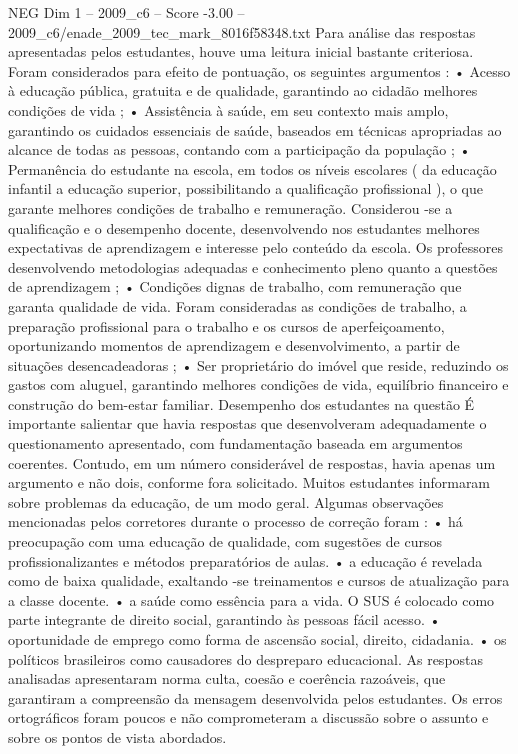 \begin{textsample}{NEG Dim 1 – 2009\_c6 – Score -3.00 – 2009\_c6/enade\_2009\_tec\_mark\_8016f58348.txt}
Para análise das respostas apresentadas pelos estudantes, houve uma leitura inicial bastante criteriosa.
Foram considerados para efeito de pontuação, os seguintes argumentos : • Acesso à educação pública, gratuita e de qualidade, garantindo ao cidadão melhores condições de vida ; • Assistência à saúde, em seu contexto mais amplo, garantindo os cuidados essenciais de saúde, baseados em técnicas apropriadas ao alcance de todas as pessoas, contando com a participação da população ; • Permanência do estudante na escola, em todos os níveis escolares ( da educação infantil a educação superior, possibilitando a qualificação profissional ), o que garante melhores condições de trabalho e remuneração.
Considerou -se a qualificação e o desempenho docente, desenvolvendo nos estudantes melhores expectativas de aprendizagem e interesse pelo conteúdo da escola.
Os professores desenvolvendo metodologias adequadas e conhecimento pleno quanto a questões de aprendizagem ; • Condições dignas de trabalho, com remuneração que garanta qualidade de vida.
Foram consideradas as condições de trabalho, a preparação profissional para o trabalho e os cursos de aperfeiçoamento, oportunizando momentos de aprendizagem e desenvolvimento, a partir de situações desencadeadoras ; • Ser proprietário do imóvel que reside, reduzindo os gastos com aluguel, garantindo melhores condições de vida, equilíbrio financeiro e construção do bem-estar familiar.
Desempenho dos estudantes na questão É importante salientar que havia respostas que desenvolveram adequadamente o questionamento apresentado, com fundamentação baseada em argumentos coerentes.
Contudo, em um número considerável de respostas, havia apenas um argumento e não dois, conforme fora solicitado.
Muitos estudantes informaram sobre problemas da educação, de um modo geral.
Algumas observações mencionadas pelos corretores durante o processo de correção foram : • há preocupação com uma educação de qualidade, com sugestões de cursos profissionalizantes e métodos preparatórios de aulas. • a educação é revelada como de baixa qualidade, exaltando -se treinamentos e cursos de atualização para a classe docente. • a saúde como essência para a vida.
O SUS é colocado como parte integrante de direito social, garantindo às pessoas fácil acesso. • oportunidade de emprego como forma de ascensão social, direito, cidadania. • os políticos brasileiros como causadores do despreparo educacional.
As respostas analisadas apresentaram norma culta, coesão e coerência razoáveis, que garantiram a compreensão da mensagem desenvolvida pelos estudantes.
Os erros ortográficos foram poucos e não comprometeram a discussão sobre o assunto e sobre os pontos de vista abordados.

\end{textsample}
